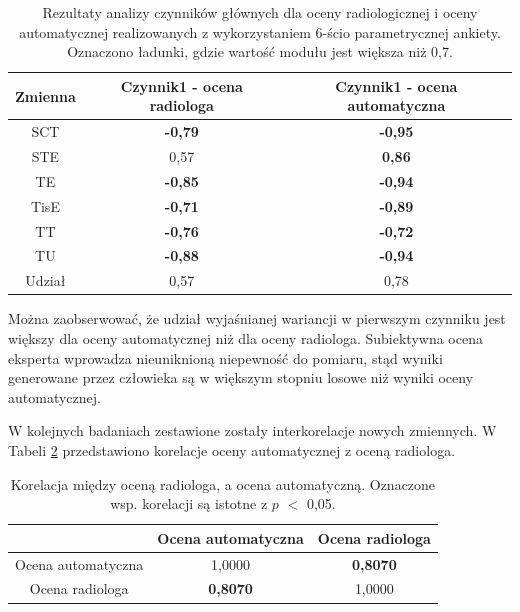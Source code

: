 \begin{table}[h]
	\centering
	\setlength{\tabcolsep}{3pt}
	\setlength\extrarowheight{2pt}
	\caption{Rezultaty analizy czynników głównych dla oceny radiologicznej i oceny automatycznej realizowanych z wykorzystaniem 6-ścio parametrycznej ankiety. Oznaczono ładunki, gdzie wartość modułu jest większa niż 0,7.}
	\label{tab:pca-gt-pred}
	\begin{tabular}{c|c|c}
		Zmienna&Czynnik1 - ocena radiologa&Czynnik1 - ocena automatyczna \\
		\hline \hline
		SCT&\textbf{-0,79}&\textbf{-0,95}\\
		\hline
		STE&0,57&\textbf{0,86}\\
		\hline
		TE&\textbf{-0,85}&\textbf{-0,94}\\
		\hline
		TisE&\textbf{-0,71}&\textbf{-0,89}\\
		\hline
		TT&\textbf{-0,76}&\textbf{-0,72}\\
		\hline
		TU&\textbf{-0,88}&\textbf{-0,94}\\
		\hline \hline	
		Udział&0,57&0,78\\
		
	\end{tabular}
\end{table}

Można zaobserwować, że udział wyjaśnianej wariancji w pierwszym czynniku jest większy dla oceny automatycznej niż dla oceny radiologa. Subiektywna ocena eksperta wprowadza nieuniknioną niepewność do pomiaru, stąd wyniki generowane przez człowieka są w większym stopniu losowe niż wyniki oceny automatycznej. 

W kolejnych badaniach zestawione zostały interkorelacje nowych zmiennych. \linebreak W Tabeli \ref{tab:gtVSpred} przedstawiono korelacje oceny automatycznej z oceną radiologa.

\vspace{10px}
\begin{table}[h]
	\centering
	\setlength{\tabcolsep}{3pt}
	\setlength\extrarowheight{2pt}
	\caption{Korelacja między oceną radiologa, a ocena automatyczną. Oznaczone wsp. korelacji są istotne z $p$ $<$ 0,05.}
	\label{tab:gtVSpred}
	\begin{tabular}{c|c|c}
		&Ocena automatyczna &Ocena radiologa \\
		\hline \hline
		Ocena automatyczna&1,0000&\textbf{0,8070}\\
		\hline
		Ocena radiologa&\textbf{0,8070}&1,0000\\
		
	\end{tabular}
\end{table}

